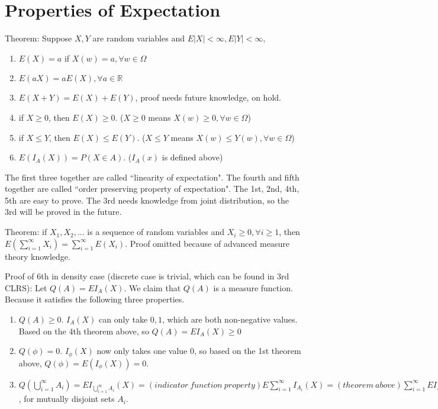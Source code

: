 \documentclass[12pt]{article}
\begin{document}
\section{Properties of Expectation}

Theorem: Suppose $X,Y$ are random variables and $E|X|<\infty,E|Y|<\infty$,
\begin{enumerate}
    \item $E(X)=a$ if $X(w)=a, \forall w\in\Omega$
    \item $E(aX)=aE(X), \forall a\in\mathbb{R}$
    \item $E(X+Y)=E(X)+E(Y)$, proof needs future knowledge, on hold.
    \item if $X\ge 0$, then $E(X)\ge 0$. ($X\ge 0$ means $X(w)\ge 0,\forall w\in\Omega$)
    \item if $X\le Y$, then $E(X)\le E(Y)$. ($X\le Y$ means $X(w)\le Y(w),\forall w\in\Omega$)
    \item $E(I_A(X))=P(X\in A)$. ($I_A(x)$ is defined above)
\end{enumerate}
The first three together are called ``linearity of expectation".
The fourth and fifth together are called ``order preserving property of expectation".
The 1st, 2nd, 4th, 5th are easy to prove. The 3rd needs knowledge from joint
distribution, so the 3rd will be proved in the future.

\bigbreak
Theorem: if $X_1,X_2,...$ is a sequence of random variables and $X_i\ge 0,\forall i\ge 1$,
then $E(\sum\limits_{i=1}^{\infty}X_i)=\sum\limits_{i=1}^{\infty}E(X_i)$. Proof omitted because
of advanced measure theory knowledge.

\bigbreak
Proof of 6th in density case (discrete case is trivial, which can be found in 3rd CLRS):
Let $Q(A)=EI_A(X)$. We claim that $Q(A)$ is a measure function. Because it
satisfies the following three properties.
\begin{enumerate}
    \item $Q(A)\ge 0$. $I_A(X)$ can only take $0,1$, which are both non-negative values. Based on the 4th
        theorem above, so $Q(A)=EI_A(X)\ge 0$
    \item $Q(\phi)=0$. $I_{\phi}(X)$ now only takes one value $0$, so based on the 1st theorem above,
        $Q(\phi)=E(I_{\phi}(X))=0$.
    \item $Q(\bigcup\limits_{i=1}^{\infty}A_i)=EI_{\bigcup\limits_{i=1}^{\infty}A_i}(X)
        =(indicator\ function\ property)E\sum\limits_{i=1}^{\infty}I_{A_i}(X)
        =(theorem\ above)\sum\limits_{i=1}^{\infty}EI_{A_i}(X)
        =\sum\limits_{i=1}^{\infty}Q(A_i)$, for mutually disjoint sets $A_i$.
\end{enumerate}
\end{document}
